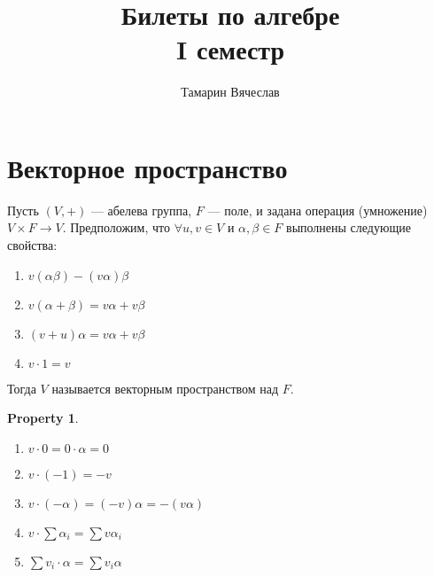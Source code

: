 \documentclass[11pt]{book}
\title{Билеты по алгебре \\ I семестр}
\author{Тамарин Вячеслав}
\theoremstyle{definition}
\theoremstyle{plain}
\theoremstyle{plain}
\newtheorem*{prop}{Property}
\theoremstyle{definition}
\theoremstyle{remark}
\begin{document}
\maketitle

\section{Векторное пространство}
\begin{defn}
    Пусть $ (V, +)$ --- абелева группа,  $ F$ --- поле, и задана операция (умножение)  $ V \times F \to  V$. Предположим, что $ \forall  u, v \in V $ и $ \alpha, \beta \in F$ выполнены следующие свойства:
    \begin{enumerate}
	\item  $ v(\alpha \beta) - (v\alpha)\beta$
	\item  $ v(\alpha+\beta) = v\alpha + v\beta$
	\item  $ (v+u)\alpha = v\alpha+v\beta$
	\item  $ v \cdot 1 = v$
    \end{enumerate}
Тогда $ V$ называется векторным пространством над   $ F$.
\end{defn}
\begin{prop}
    $ $
    \begin{enumerate}
	\item $ v \cdot 0 = 0 \cdot \alpha  = 0$
	\item $ v \cdot (-1) = -v$
	\item $ v \cdot (-\alpha) = (-v)\alpha = - (v \alpha)$
	\item $v \cdot \sum \alpha_i = \sum v\alpha_i$
	\item $ \sum v_i \cdot \alpha = \sum v_i\alpha$
    \end{enumerate}
\end{prop}
\end{document}
